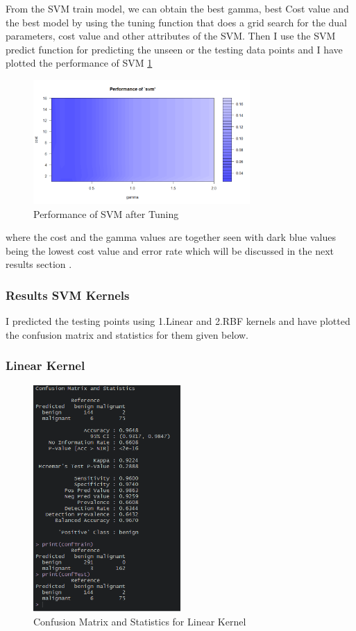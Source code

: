 \documentclass[conference]{IEEEtran}
\begin{document}
From the SVM \cite{kernme}train model, we can obtain the best gamma, best Cost value and the best model by using the tuning function that does a grid search for the dual parameters, cost value and other attributes of the SVM. Then I use the SVM predict function for predicting the unseen or the testing data points and I have plotted the performance of SVM \ref{fig:perf95_svm} 

\begin{figure}[htb!]
\centering
\includegraphics[width=3.25in]{figs/Perf95.png}
\caption{Performance of SVM after Tuning}
\label{fig:perf95_svm} 
\end{figure}
where the cost and the gamma values are together seen with dark blue values being the lowest cost value and error rate which will be discussed in the next results section .

\subsubsection{Results SVM Kernels}
I predicted the testing points using 1.Linear and 2.RBF  kernels and have plotted the confusion matrix and statistics for them given below.
\subsubsection{Linear Kernel}

\begin{figure}[h]
\centering
\includegraphics[width=0.5\textwidth]{figs/after_tuning_linear.png}
\caption{Confusion Matrix and Statistics for Linear Kernel}
\label{fig:LIN_ker} 
\end{figure}
\end{document}
